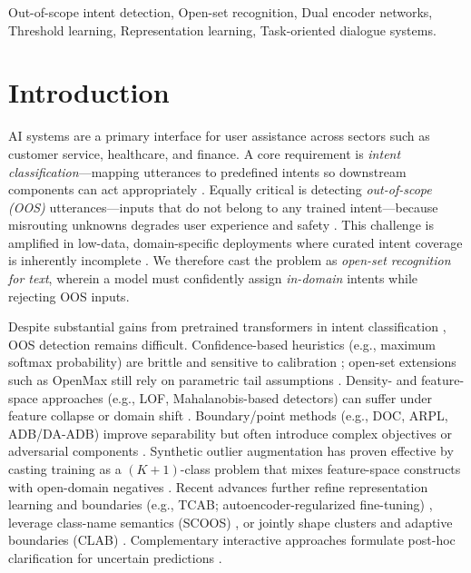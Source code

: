\documentclass[journal,letterpaper]{IEEEtran}
\begin{document}
\begin{IEEEkeywords}
Out-of-scope intent detection, Open-set recognition, Dual encoder networks, Threshold learning, Representation learning, Task-oriented dialogue systems.
\end{IEEEkeywords}

\section{Introduction}

 AI systems are a primary interface for user assistance across sectors such as customer service, healthcare, and finance. A core requirement is \emph{intent classification}—mapping utterances to predefined intents so downstream components can act appropriately \cite{Coucke_2018}. Equally critical is detecting \emph{out-of-scope (OOS)} utterances—inputs that do not belong to any trained intent—because misrouting unknowns degrades user experience and safety \cite{Cavalin_2020}. This challenge is amplified in low-data, domain-specific deployments where curated intent coverage is inherently incomplete \cite{Casanueva_2020}. We therefore cast the problem as \emph{open-set recognition for text}, wherein a model must confidently assign \emph{in-domain} intents while rejecting OOS inputs.


Despite substantial gains from pretrained transformers in intent classification \cite{devlin-etal-2019-bert}, OOS detection remains difficult. Confidence-based heuristics (e.g., maximum softmax probability) are brittle and sensitive to calibration \cite{hendrycks2018baseline}; open-set extensions such as OpenMax still rely on parametric tail assumptions \cite{bendale2015open}. Density- and feature-space approaches (e.g., LOF, Mahalanobis-based detectors) can suffer under feature collapse or domain shift \cite{Breunig2000,xu-etal-2021-unsupervised}. Boundary/point methods (e.g., DOC, ARPL, ADB/DA-ADB) improve separability but often introduce complex objectives or adversarial components \cite{shu-etal-2017-doc, Guangyao2022, Zhang_2021 ,DA-ADB_2023}. Synthetic outlier augmentation has proven effective by casting training as a $(K{+}1)$-class problem that mixes feature-space constructs with open-domain negatives \cite{Zhan_2021}. Recent advances further refine representation learning and boundaries (e.g., TCAB; autoencoder-regularized fine-tuning) \cite{chen2024tcab,zhang2024finetuning}, leverage class-name semantics (SCOOS) \cite{gautam2024scoos}, or jointly shape clusters and adaptive boundaries (CLAB) \cite{liu2023clab}. Complementary interactive approaches formulate post-hoc clarification for uncertain predictions \cite{hengst2024cicc}.
\end{document}
